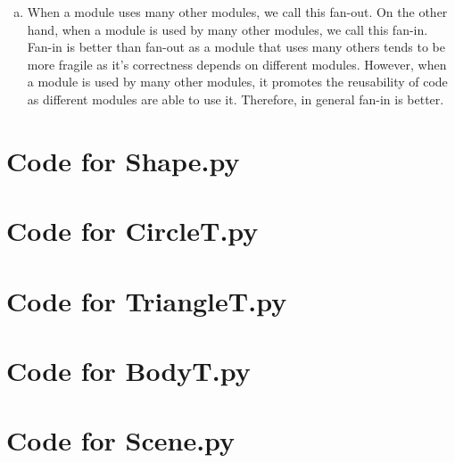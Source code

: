 \documentclass[12pt]{article}
\begin{document}
\begin{enumerate}[a)]
\item When a module uses many other modules, we call this fan-out. On the other hand, when a module is used by many other modules, we call this fan-in. Fan-in is better than fan-out as a module that uses many others tends to be more fragile as it's correctness depends on different modules. However, when a module is used by many other modules, it promotes the reusability of code as different modules are able to use it. Therefore, in general fan-in is better.
\end{enumerate}

\newpage

\lstset{language=Python, basicstyle=\tiny, breaklines=true, showspaces=false,
  showstringspaces=false, breakatwhitespace=true}

\def\thesection{\Alph{section}}

\section{Code for Shape.py}

\noindent 

\newpage

\section{Code for CircleT.py}

\noindent 

\newpage

\section{Code for TriangleT.py}

\noindent 

\newpage

\section{Code for BodyT.py}

\noindent 

\newpage

\section{Code for Scene.py}
\end{document}
